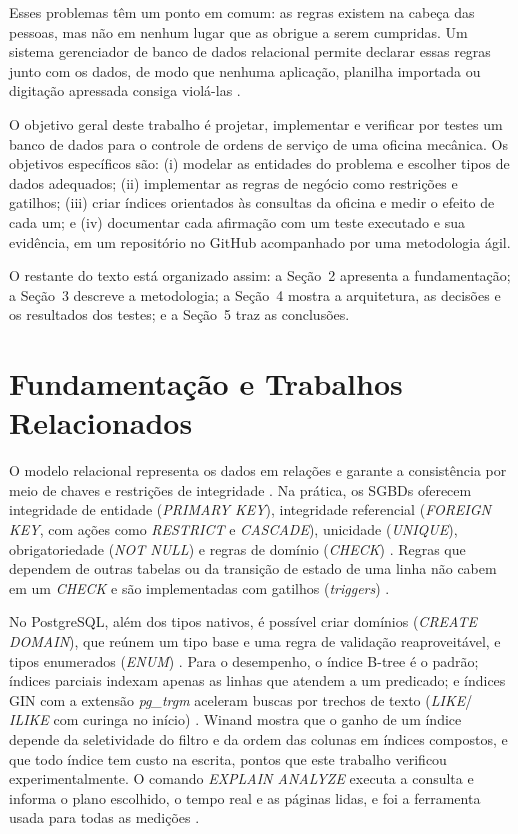 \documentclass[a4paper,12pt]{article}
\begin{document}
Esses problemas têm um ponto em comum: as regras existem na cabeça das
pessoas, mas não em nenhum lugar que as obrigue a serem cumpridas. Um
sistema gerenciador de banco de dados relacional permite declarar essas
regras junto com os dados, de modo que nenhuma aplicação, planilha
importada ou digitação apressada consiga violá-las
\cite{codd1970,elmasri2016}.

O objetivo geral deste trabalho é projetar, implementar e verificar por
testes um banco de dados para o controle de ordens de serviço de uma
oficina mecânica. Os objetivos específicos são: (i) modelar as entidades
do problema e escolher tipos de dados adequados; (ii) implementar as
regras de negócio como restrições e gatilhos; (iii) criar índices
orientados às consultas da oficina e medir o efeito de cada um; e (iv)
documentar cada afirmação com um teste executado e sua evidência, em um
repositório no GitHub acompanhado por uma metodologia ágil.

O restante do texto está organizado assim: a Seção~2 apresenta a
fundamentação; a Seção~3 descreve a metodologia; a Seção~4 mostra a
arquitetura, as decisões e os resultados dos testes; e a Seção~5 traz as
conclusões.

\section{Fundamentação e Trabalhos Relacionados}

O modelo relacional representa os dados em relações e garante a
consistência por meio de chaves e restrições de integridade
\cite{codd1970}. Na prática, os SGBDs oferecem integridade de entidade
(\emph{PRIMARY KEY}), integridade referencial (\emph{FOREIGN KEY}, com
ações como \emph{RESTRICT} e \emph{CASCADE}), unicidade (\emph{UNIQUE}),
obrigatoriedade (\emph{NOT NULL}) e regras de domínio (\emph{CHECK})
\cite{elmasri2016,silberschatz2019}. Regras que dependem de outras
tabelas ou da transição de estado de uma linha não cabem em um
\emph{CHECK} e são implementadas com gatilhos (\emph{triggers})
\cite{silberschatz2019,pgdocs}.

No PostgreSQL, além dos tipos nativos, é possível criar domínios
(\emph{CREATE DOMAIN}), que reúnem um tipo base e uma regra de validação
reaproveitável, e tipos enumerados (\emph{ENUM}) \cite{pgdocs}. Para o
desempenho, o índice B-tree é o padrão; índices parciais indexam apenas
as linhas que atendem a um predicado; e índices GIN com a extensão
\emph{pg\_trgm} aceleram buscas por trechos de texto (\emph{LIKE}/
\emph{ILIKE} com curinga no início) \cite{pgdocs}. Winand
\cite{winand2012} mostra que o ganho de um índice depende da
seletividade do filtro e da ordem das colunas em índices compostos, e
que todo índice tem custo na escrita, pontos que este trabalho
verificou experimentalmente. O comando \emph{EXPLAIN ANALYZE} executa a
consulta e informa o plano escolhido, o tempo real e as páginas lidas,
e foi a ferramenta usada para todas as medições \cite{pgdocs}.
\end{document}
